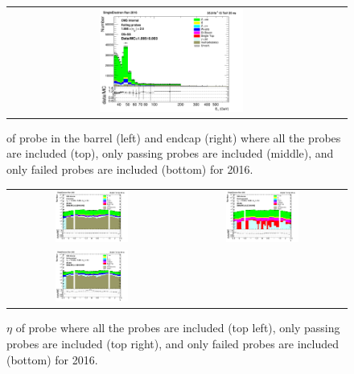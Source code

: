 \begin{figure}[htp]
\begin{center}
\begin{tabular}{cc}
      \includegraphics[width=0.45\textwidth]{figures/Zprime/2016/ScaleFactor/SameSign/nominal/stack_Et_Endcap_fail_PUW.png}
    \end{tabular}
    \caption{\et of probe in the barrel (left) and endcap (right) where all the probes are included (top), only passing probes are included (middle), and only failed probes are included (bottom) for 2016.}
    \label{fig:SS_nominal_Et_2016}
  \end{center}
\end{figure}
\begin{figure}[htp]
  \begin{center}
    \begin{tabular}{cc}
      \includegraphics[width=0.45\textwidth]{figures/Zprime/2016/ScaleFactor/SameSign/nominal/stack_eta_BE_Barrel+Endcap_probes_PUW.png} &
      \includegraphics[width=0.45\textwidth]{figures/Zprime/2016/ScaleFactor/SameSign/nominal/stack_eta_BE_Barrel+Endcap_pass_PUW.png} \\
      \includegraphics[width=0.45\textwidth]{figures/Zprime/2016/ScaleFactor/SameSign/nominal/stack_eta_BE_Barrel+Endcap_fail_PUW.png} &
    \end{tabular}
    \caption{$\eta$ of probe where all the probes are included (top left), only passing probes are included (top right), and only failed probes are included (bottom) for 2016.}
    \label{fig:SS_nominal_eta_2016}
  \end{center}
\end{figure}
